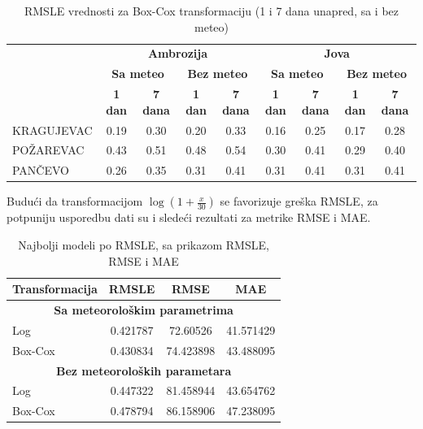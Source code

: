 \documentclass[12pt]{article}
\begin{document}
\begin{table}[h!]
\centering
\caption{RMSLE vrednosti za Box-Cox transformaciju (1 i 7 dana unapred, sa i bez meteo)}
\begin{tabular}{|l|c|c|c|c||c|c|c|c|}
\hline
\label{tab:rmsle_boxcox}
\multirow{3}{*}{\textbf{Grad}} 
& \multicolumn{4}{c||}{\textbf{Ambrozija}} 
& \multicolumn{4}{c|}{\textbf{Jova}} \\ \cline{2-9}
& \multicolumn{2}{c|}{\textbf{Sa meteo}} & \multicolumn{2}{c||}{\textbf{Bez meteo}} 
& \multicolumn{2}{c|}{\textbf{Sa meteo}} & \multicolumn{2}{c|}{\textbf{Bez meteo}} \\ \cline{2-9}
& \textbf{1 dan} & \textbf{7 dana} & \textbf{1 dan} & \textbf{7 dana} 
& \textbf{1 dan} & \textbf{7 dana} & \textbf{1 dan} & \textbf{7 dana} \\ \hline
KRAGUJEVAC     & 0.19 & 0.30 & 0.20 & 0.33 & 0.16 & 0.25 & 0.17 & 0.28 \\ \hline
POŽAREVAC & 0.43 & 0.51 & 0.48 & 0.54 & 0.30 & 0.41 & 0.29 & 0.40 \\ \hline
PANČEVO        & 0.26 & 0.35 & 0.31 & 0.41 & 0.31 & 0.41 & 0.31 & 0.41 \\ \hline
\end{tabular}
\end{table}
\newpage
Budući da transformacijom $\log(1+\frac{x}{30})$ se favorizuje greška RMSLE, za potpuniju usporedbu dati su i sledeći rezultati za metrike RMSE i MAE.

\begin{table}[h!]
\centering
\caption{Najbolji modeli po RMSLE, sa prikazom RMSLE, RMSE i MAE}
\label{tab:best_models_metrics}
\begin{tabular}{|l|c|c|c|}
\hline
\textbf{Transformacija} & \textbf{RMSLE} & \textbf{RMSE} & \textbf{MAE} \\ \hline
\multicolumn{4}{|c|}{\textbf{Sa meteorološkim parametrima}} \\ \hline
Log      & 0.421787 & 72.60526 & 41.571429 \\  \hline
Box-Cox  & 0.430834 & 74.423898 & 43.488095 \\ \hline
\multicolumn{4}{|c|}{\textbf{Bez meteoroloških parametara}} \\ \hline
Log      & 0.447322 & 81.458944 & 43.654762 \\  \hline
Box-Cox  & 0.478794 & 86.158906 & 47.238095 \\ \hline
\end{tabular}
\end{table}
\end{document}
